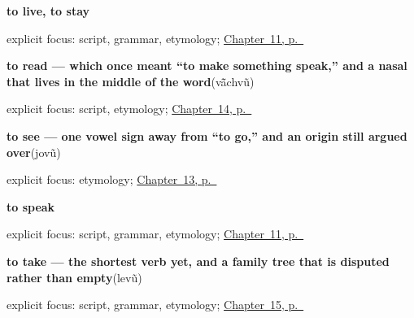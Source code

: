 \noindent\begin{minipage}[t]{\linewidth}
\raggedright
\textbf{to live, to stay}\enspace\emph{}\par
\footnotesize explicit focus: script, grammar, etymology; \hyperref[ch:first-verbs]{Chapter~11, p.~\pageref*{ch:first-verbs}}
\end{minipage}\par\smallskip

\noindent\begin{minipage}[t]{\linewidth}
\raggedright
\textbf{to read — which once meant \textquotedblleft{}to make something speak,\textquotedblright{} and a nasal that lives in the middle of the word}\enspace\emph{}\enspace(vā̃chvũ)\par
\footnotesize explicit focus: script, etymology; \hyperref[ch:gu-mind-and-page]{Chapter~14, p.~\pageref*{ch:gu-mind-and-page}}
\end{minipage}\par\smallskip

\noindent\begin{minipage}[t]{\linewidth}
\raggedright
\textbf{to see — one vowel sign away from “to go,” and an origin still argued over}\enspace\emph{}\enspace(jovũ)\par
\footnotesize explicit focus: etymology; \hyperref[ch:gu-core-verbs]{Chapter~13, p.~\pageref*{ch:gu-core-verbs}}
\end{minipage}\par\smallskip

\noindent\begin{minipage}[t]{\linewidth}
\raggedright
\textbf{to speak}\enspace\emph{}\par
\footnotesize explicit focus: script, grammar, etymology; \hyperref[ch:first-verbs]{Chapter~11, p.~\pageref*{ch:first-verbs}}
\end{minipage}\par\smallskip

\noindent\begin{minipage}[t]{\linewidth}
\raggedright
\textbf{to take — the shortest verb yet, and a family tree that is disputed rather than empty}\enspace\emph{}\enspace(levũ)\par
\footnotesize explicit focus: script, grammar, etymology; \hyperref[ch:gu-doing-verbs]{Chapter~15, p.~\pageref*{ch:gu-doing-verbs}}
\end{minipage}\par\smallskip


